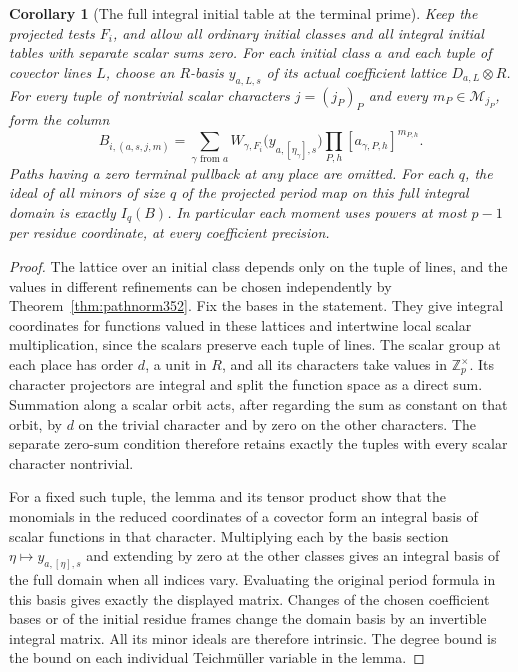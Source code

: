 \documentclass[a4paper,11pt]{article}
\newtheorem{corollary}[proposition]{Corollary}
\theoremstyle{definition}
\theoremstyle{remark}
\newcommand{\ZZ}{\mathbb Z}\newcommand{\ord}{\operatorname{ord}}
\numberwithin{equation}{section}
\begin{document}
\begin{corollary}[The full integral initial table at the terminal prime]\leavevmode
\label{cor:fullperiodmoments400}
Keep the projected tests \(F_i\), and allow all ordinary initial
classes and all integral initial tables with separate scalar sums
zero. For each initial class \(a\) and each tuple of covector
lines \(L\), choose an \(R\)-basis \(y_{a,L,s}\) of its actual
coefficient lattice \(D_{a,L}\otimes R\). For every tuple of
nontrivial scalar characters \(j=(j_P)_P\) and every
\(m_P\in\mathcal M_{j_P}\), form the column
\[
  B_{i,(a,s,j,m)}=\sum_{\gamma\text{ from }a}
       W_{\gamma,F_i}\bigl(y_{a,[\eta_\gamma],s}\bigr)
                       \prod_{P,h}[a_{\gamma,P,h}]^{m_{P,h}} .
\]
Paths having a zero terminal pullback at any place are omitted.
For each \(q\), the ideal of all minors of size \(q\) of the
projected period map on this full integral domain is exactly
\(I_q(B)\). In particular each moment uses powers at most
\(p-1\) per residue coordinate, at every coefficient precision.
\end{corollary}
\begin{proof}
The lattice over an initial class depends only on the tuple
of lines, and the values in different refinements can be
chosen independently by Theorem~\ref{thm:pathnorm352}. Fix the
bases in the statement. They give integral coordinates for
functions valued in these lattices and intertwine local scalar
multiplication, since the scalars preserve each tuple of lines.
The scalar group at each place has order \(d\), a unit in \(R\),
and all its characters take values in \(\ZZ_p^\times\). Its
character projectors are integral and split the function space
as a direct sum. Summation along a scalar orbit acts, after
regarding the sum as constant on that orbit, by \(d\) on the
trivial character and by zero on the other characters. The
separate zero-sum condition therefore retains exactly the tuples
with every scalar character nontrivial.

For a fixed such tuple, the lemma and its tensor product show
that the monomials in the reduced coordinates of a covector
form an integral basis of scalar functions in that character.
Multiplying each by the basis section \(\eta\mapsto
 y_{a,[\eta],s}\) and extending by zero at the other classes
gives an integral basis of the full domain when all indices
vary. Evaluating the original period formula in this basis gives
exactly the displayed matrix. Changes of the chosen coefficient
bases or of the initial residue frames change the domain basis
by an invertible integral matrix. All its minor ideals are
therefore intrinsic. The degree bound is the bound on each
individual Teichm\"uller variable in the lemma.
\end{proof}
\end{document}
